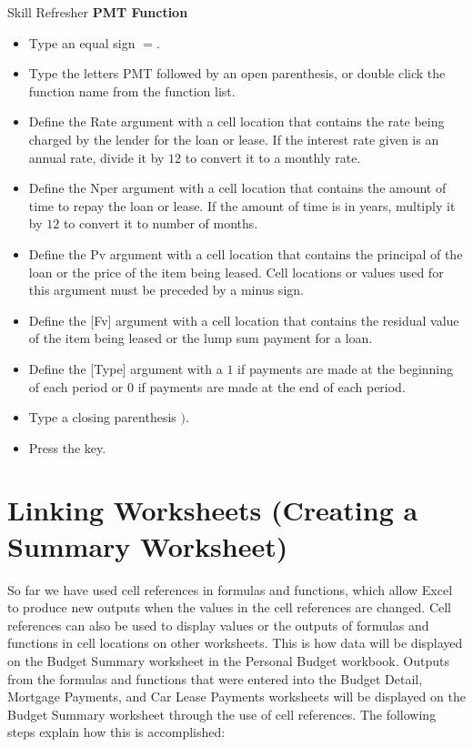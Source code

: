 \begin{center}
	\begin{sklbox}{Skill Refresher}
		\textbf{PMT Function}
		\\
		\begin{itemize}
			\setlength{\itemsep}{0pt}
			\setlength{\parskip}{0pt}
			\setlength{\parsep}{0pt}
			
			\item Type an equal sign $ = $.
			\item Type the letters PMT followed by an open parenthesis, or double click the function name from the function list.
			\item Define the Rate argument with a cell location that contains the rate being charged by the lender for the loan or lease. If the interest rate given is an annual rate, divide it by $ 12 $ to convert it to a monthly rate.
			\item Define the Nper argument with a cell location that contains the amount of time to repay the loan or lease. If the amount of time is in years, multiply it by $ 12 $ to convert it to number of months.
			\item Define the Pv argument with a cell location that contains the principal of the loan or the price of the item being leased. Cell locations or values used for this argument must be preceded by a minus sign.
			\item Define the [Fv] argument with a cell location that contains the residual value of the item being leased or the lump sum payment for a loan.
			\item Define the [Type] argument with a $ 1 $ if payments are made at the beginning of each period or $ 0 $ if payments are made at the end of each period.
			\item Type a closing parenthesis $ ) $.
			\item Press the  key.
			
		\end{itemize}
	\end{sklbox}
\end{center}

\section{Linking Worksheets (Creating a Summary Worksheet)}

So far we have used cell references in formulas and functions, which allow Excel to produce new
outputs when the values in the cell references are changed. Cell references can also be used to display
values or the outputs of formulas and functions in cell locations on other worksheets. This is how data
will be displayed on the Budget Summary worksheet in the Personal Budget workbook. Outputs
from the formulas and functions that were entered into the Budget Detail, Mortgage Payments,
and Car Lease Payments worksheets will be displayed on the Budget Summary worksheet through
the use of cell references. The following steps explain how this is accomplished:

